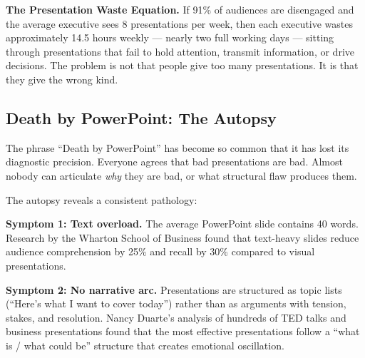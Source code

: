 \begin{diagnosisbox}
\textbf{The Presentation Waste Equation.} If 91\% of audiences are disengaged and the average executive sees 8 presentations per week, then each executive wastes approximately 14.5 hours weekly --- nearly two full working days --- sitting through presentations that fail to hold attention, transmit information, or drive decisions. The problem is not that people give too many presentations. It is that they give the wrong kind.
\end{diagnosisbox}

\subsection{Death by PowerPoint: The Autopsy}

The phrase ``Death by PowerPoint'' has become so common that it has lost its diagnostic precision. Everyone agrees that bad presentations are bad. Almost nobody can articulate \emph{why} they are bad, or what structural flaw produces them.

The autopsy reveals a consistent pathology:

\textbf{Symptom 1: Text overload.} The average PowerPoint slide contains 40 words. Research by the Wharton School of Business found that text-heavy slides reduce audience comprehension by 25\% and recall by 30\% compared to visual presentations.

\textbf{Symptom 2: No narrative arc.} Presentations are structured as topic lists (``Here's what I want to cover today'') rather than as arguments with tension, stakes, and resolution. Nancy Duarte's analysis of hundreds of TED talks and business presentations found that the most effective presentations follow a ``what is / what could be'' structure that creates emotional oscillation.

